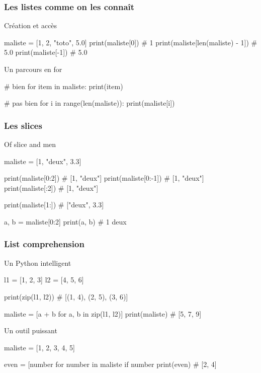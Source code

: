 \documentclass{beamer}
\begin{document}
\begin{frame}[fragile]
  \frametitle{Les listes comme on les connaît}

  \begin{block}{Création et accès}
    \begin{python}
maliste = [1, 2, "toto", 5.0]
print(maliste[0]) # 1
print(maliste[len(maliste) - 1]) # 5.0
print(maliste[-1]) # 5.0
    \end{python}
  \end{block}

  \begin{block}{Un parcours en for}
    \begin{python}
# bien
for item in maliste:
  print(item)

# pas bien
for i in range(len(maliste)):
  print(maliste[i])
    \end{python}
  \end{block}

\end{frame}


\begin{frame}[fragile]
  \frametitle{Les slices}
  \begin{block}{Of slice and men}
    \begin{python}
maliste = [1, "deux", 3.3]

print(maliste[0:2]) # [1, "deux"]
print(maliste[0:-1]) # [1, "deux"]
print(maliste[:2]) # [1, "deux"]

print(maliste[1:]) # ["deux", 3.3]

a, b = maliste[0:2]
print(a, b) # 1 deux
    \end{python}
  \end{block}
\end{frame}

\begin{frame}[fragile]
  \frametitle{List comprehension}

  \begin{block}{Un Python intelligent}
    \begin{python}
l1 = [1, 2, 3]
l2 = [4, 5, 6]

print(zip(l1, l2)) # [(1, 4), (2, 5), (3, 6)]

maliste = [a + b for a, b in zip(l1, l2)]
print(maliste) # [5, 7, 9]
    \end{python}
  \end{block}

  \begin{block}{Un outil puissant}
    \small
    \begin{python}
maliste = [1, 2, 3, 4, 5]

even = [number for number in maliste
               if number %
print(even) # [2, 4]
    \end{python}
    
  \end{block}
\end{frame}
\end{document}
